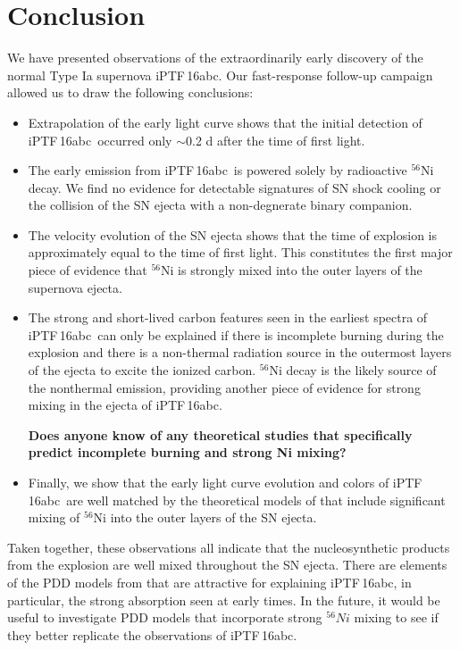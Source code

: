 \documentclass[twocolumn]{aastex61}
\newcommand{\abc}{iPTF\,16abc}
\begin{document}
\section{Conclusion}
\label{sec:conclusion}

We have presented observations of the extraordinarily early discovery of the 
normal Type Ia supernova \abc. Our fast-response follow-up 
campaign allowed us to draw the following conclusions:

\begin{itemize}
    \item Extrapolation of the early light curve shows that the initial detection of \abc\ occurred only $\sim$0.2 d after the time of first light.

    \item The early emission from \abc\ is powered solely by radioactive $^{56}$Ni decay. We find no evidence for detectable signatures of SN shock cooling or the collision of the SN ejecta with a non-degnerate binary companion.

\item The velocity evolution of the SN ejecta shows that the time of explosion is approximately equal to the time of first light. This constitutes the first major piece of evidence that $^{56}$Ni is strongly mixed into the outer layers of the supernova ejecta.

\item The strong and short-lived carbon features seen in the 
earliest spectra of \abc\ can only be explained if there is incomplete burning during the explosion and there is a non-thermal 
radiation source in the outermost layers of the ejecta to excite the ionized carbon. $^{56}$Ni decay is the likely source of the nonthermal emission, providing another piece of evidence for strong mixing in the ejecta of \abc. 

\textbf{Does anyone know of any theoretical studies that specifically predict incomplete burning and strong Ni mixing?}

\item Finally, we show that the early light curve evolution and colors of \abc\ are well matched by the theoretical models of \citet{2016ApJ...826...96P} that include significant mixing of $^{56}$Ni into the outer layers of the SN ejecta. 
 
\end{itemize}
%
Taken together, these observations all indicate that the nucleosynthetic products from the explosion are well mixed throughout the SN ejecta. There are elements of the PDD models from \citet{2014MNRAS.441..532D} that are attractive for explaining \abc, in particular, the strong  absorption seen at early times. In the future, it would be useful to investigate PDD models that incorporate strong $^{56}Ni$ mixing to see if they better replicate the observations of \abc.  
\end{document}
